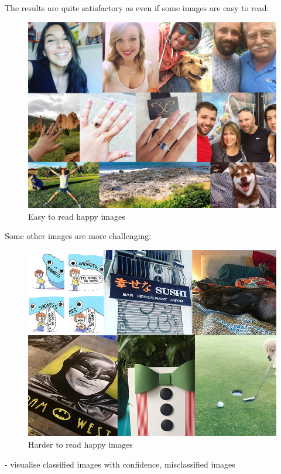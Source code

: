 The results are quite satisfactory as even if some images are easy to read:

\begin{figure}[H]
    \centering
    \includegraphics[width=\textwidth]{Images/happy_easy.jpg}
    \caption{Easy to read happy images}
\end{figure}

Some other images are more challenging:

\begin{figure}[H]
    \centering
    \includegraphics[width=\textwidth]{Images/happy_hard.jpg}
    \caption{Harder to read happy images}
\end{figure}

- visualise classified images with confidence, misclassified images




